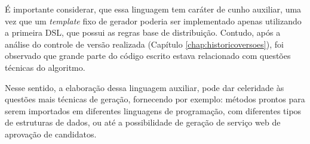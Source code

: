    
 
 É importante considerar, que essa linguagem tem caráter de cunho auxiliar, uma vez que um \textit{template} fixo de gerador poderia ser implementado apenas utilizando a primeira \gls{DSL}, que possui as regras base de distribuição. Contudo, após a análise do controle de versão realizada (Capítulo \ref{chap:historicoversoes}), foi observado que grande parte do código escrito estava relacionado com questões técnicas do algoritmo.
 
 Nesse sentido, a elaboração dessa linguagem auxiliar, pode dar celeridade às questões mais técnicas de geração, fornecendo por exemplo: métodos prontos para serem importados em diferentes linguagens de programação, com diferentes tipos de estruturas de dados, ou até a possibilidade de geração de serviço web de aprovação de candidatos.

